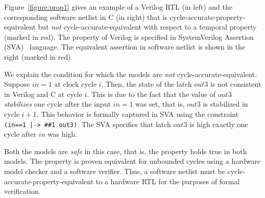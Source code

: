 \begin{example}
%
Figure~\ref{figure:prop1} gives an example of a Verilog RTL (in left) and 
the corresponding software netlist in C (in right) that is 
cycle-accurate-property-equivalent but \emph{not} cycle-accurate-equivalent 
with respect to a temporal property (marked in red).  The property of Verilog 
is specified in SystemVerilog Assertion (SVA)~\cite{SVA} language.  
The equivalent assertion in software netlist is shown in the right (marked in red).  

We explain the condition for which the models are \emph{not}
cycle-accurate-equivalent.  Suppose $in=1$ at clock cycle $i$. 
Then, the state of the latch $out3$ is not consistent in 
Verilog and C at cycle $i$.  This is due to the fact that 
the value of $out3$ \emph{stabilizes} one cycle after the 
input $in=1$ was set, that is, $out3$ is stabilized in cycle $i+1$.  
This behavior is formally captured 
in SVA using the constraint \texttt{(in==1 |-> \#\#1 out3)}.  The SVA 
specifies that latch $out3$ is high exactly one cycle after $in$ was high.  



Both the models are \emph{safe} in this case, that is, the property 
holds true in both models.  The property is proven equivalent for 
unbounded cycles using a hardware model checker and a software verifier.  
Thus, a software netlist must be cycle-accurate-property-equivalent to a
hardware RTL for the purposes of formal verification. 

\end{example}
%


